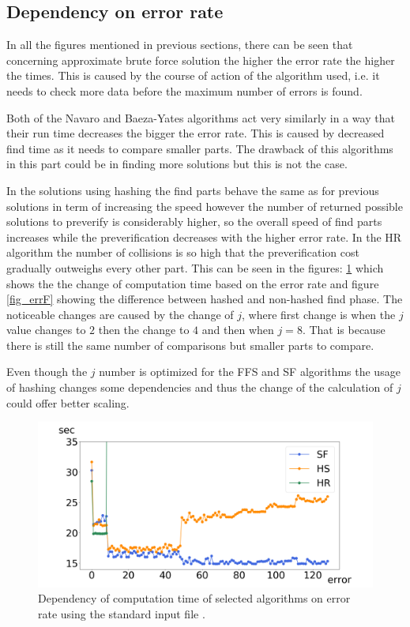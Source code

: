 \subsection{Dependency on error rate} \label{depErrRate}
In all the figures mentioned in previous sections, there can be seen that concerning approximate brute force solution the higher the error rate the higher the times. This is caused by the course of action of the algorithm used, i.e. it needs to check more data before the maximum number of errors is found.

Both of the Navaro and Baeza-Yates algorithms act very similarly in a way that their run time decreases the bigger the error rate. This is caused by decreased find time as it needs to compare smaller parts. The drawback of this algorithms in this part could be in finding more solutions but this is not the case.

In the solutions using hashing the find parts behave the same as for previous solutions in term of increasing the speed however the number of returned possible solutions to preverify is considerably higher, so the overall speed of find parts increases while the preverification decreases with the higher error rate. In the HR algorithm the number of collisions is so high that the preverification cost gradually outweighs every other part. This can be seen in the figures: \ref{fig_errA} which shows the the change of computation time based on the error rate and figure \ref{fig_errF} showing the difference between hashed and non-hashed find phase. The noticeable changes are caused by the change of $j$, where first change is when the $j$ value changes to $2$ then the change to $4$ and then when $j=8$. That is because there is still the same number of comparisons but smaller parts to compare.

Even though the $j$ number is optimized for the FFS and SF algorithms the usage of hashing changes some dependencies and thus the change of the calculation of $j$ could offer better scaling.

\begin{figure}[h]
\centering
\includegraphics[width=\textwidth]{img/errorAll}
\caption{Dependency of computation time of selected algorithms on error rate using the standard input file .}
\label{fig_errA}
\end{figure}

